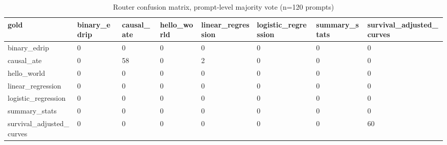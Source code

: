 \begin{table}[ht]
\centering
\caption{Router confusion matrix, prompt-level majority vote (n=120 prompts)}
\label{tab:router_confusion_matrix_majority_vote}
\begin{tabular}{llllllll}
\toprule
gold & binary\_edrip & causal\_ate & hello\_world & linear\_regression & logistic\_regression & summary\_stats & survival\_adjusted\_curves \\
\midrule
binary\_edrip & 0 & 0 & 0 & 0 & 0 & 0 & 0 \\
causal\_ate & 0 & 58 & 0 & 2 & 0 & 0 & 0 \\
hello\_world & 0 & 0 & 0 & 0 & 0 & 0 & 0 \\
linear\_regression & 0 & 0 & 0 & 0 & 0 & 0 & 0 \\
logistic\_regression & 0 & 0 & 0 & 0 & 0 & 0 & 0 \\
summary\_stats & 0 & 0 & 0 & 0 & 0 & 0 & 0 \\
survival\_adjusted\_curves & 0 & 0 & 0 & 0 & 0 & 0 & 60 \\
\bottomrule
\end{tabular}
\end{table}
